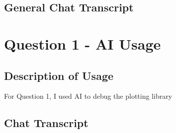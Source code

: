 {}\subsection*{General Chat Transcript} \begin{chatbox}  \end{chatbox}\markdownRendererInterblockSeparator
{}\newpage\markdownRendererInterblockSeparator
{}\section*{Question 1 - AI Usage} \subsection*{Description of Usage} For Question 1, I used AI to debug the plotting library\markdownRendererEllipsis{}\markdownRendererInterblockSeparator
{}\subsection*{Chat Transcript} \begin{chatbox}  \end{chatbox}\markdownRendererInterblockSeparator
{}\markdownRendererInterblockSeparator
{}\markdownRendererInterblockSeparator
{}\markdownRendererThematicBreak{}
\markdownRendererSectionEnd 
\markdownRendererSectionEnd 
\markdownRendererSectionEnd \markdownRendererDocumentEnd